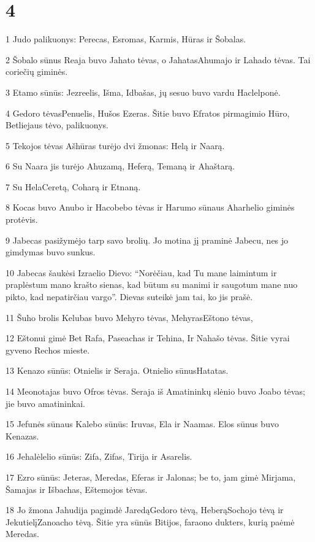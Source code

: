 \chapter{4}

\par 1 Judo palikuonys: Perecas, Esromas, Karmis, Hūras ir Šobalas. 
\par 2 Šobalo sūnus Reaja buvo Jahato tėvas, o Jahatas­Ahumajo ir Lahado tėvas. Tai coriečių giminės. 
\par 3 Etamo sūnūs: Jezreelis, Išma, Idbašas, jų sesuo buvo vardu Haclelponė. 
\par 4 Gedoro tėvas­Penuelis, Hušos­ Ezeras. Šitie buvo Efratos pirmagimio Hūro, Betliejaus tėvo, palikuonys. 
\par 5 Tekojos tėvas Ašhūras turėjo dvi žmonas: Helą ir Naarą. 
\par 6 Su Naara jis turėjo Ahuzamą, Heferą, Temaną ir Ahaštarą. 
\par 7 Su Hela­Ceretą, Coharą ir Etnaną. 
\par 8 Kocas buvo Anubo ir Hacobebo tėvas ir Harumo sūnaus Aharhelio giminės protėvis. 
\par 9 Jabecas pasižymėjo tarp savo brolių. Jo motina jį praminė Jabecu, nes jo gimdymas buvo sunkus. 
\par 10 Jabecas šaukėsi Izraelio Dievo: “Norėčiau, kad Tu mane laimintum ir praplėstum mano krašto sienas, kad būtum su manimi ir saugotum mane nuo pikto, kad nepatirčiau vargo”. Dievas suteikė jam tai, ko jis prašė. 
\par 11 Šuho brolis Kelubas buvo Mehyro tėvas, Mehyras­Eštono tėvas, 
\par 12 Eštonui gimė Bet Rafa, Paseachas ir Tehina, Ir Nahašo tėvas. Šitie vyrai gyveno Rechos mieste. 
\par 13 Kenazo sūnūs: Otnielis ir Seraja. Otnielio sūnus­Hatatas. 
\par 14 Meonotajas buvo Ofros tėvas. Seraja iš Amatininkų slėnio buvo Joabo tėvas; jie buvo amatininkai. 
\par 15 Jefunės sūnaus Kalebo sūnūs: Iruvas, Ela ir Naamas. Elos sūnus buvo Kenazas. 
\par 16 Jehalėlelio sūnūs: Zifa, Zifas, Tirija ir Asarelis. 
\par 17 Ezro sūnūs: Jeteras, Meredas, Eferas ir Jalonas; be to, jam gimė Mirjama, Šamajas ir Išbachas, Eštemojos tėvas. 
\par 18 Jo žmona Jahudija pagimdė Jaredą­Gedoro tėvą, Heberą­Sochojo tėvą ir Jekutielį­Zanoacho tėvą. Šitie yra sūnūs Bitijos, faraono dukters, kurią paėmė Meredas. 

